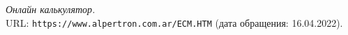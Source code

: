 \pagebreak
\begin{thebibliography}{99}
{\itshape Онлайн калькулятор.} \\URL: \texttt{https://www.alpertron.com.ar/ECM.HTM} (дата обращения: 16.04.2022).
\end{thebibliography}
\pagebreak